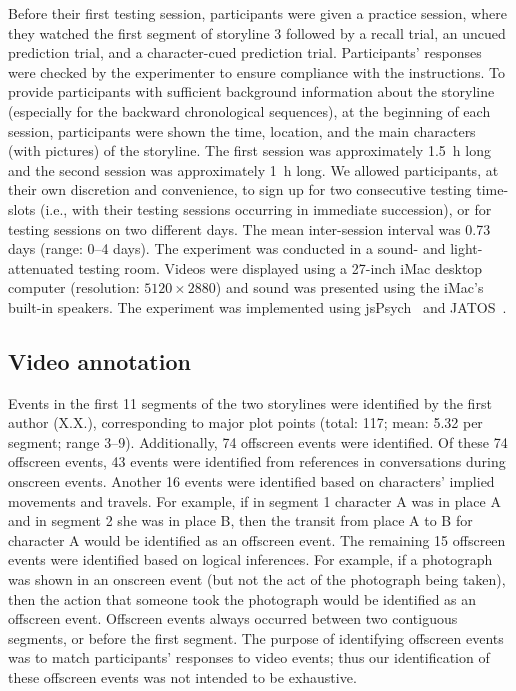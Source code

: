 \documentclass[10pt]{article}
\begin{document}
Before their first testing session, participants were given a practice session,
where they watched the first segment of storyline 3 followed by a recall trial,
an uncued prediction trial, and a character-cued prediction trial.
Participants' responses were checked by the experimenter to ensure compliance
with the instructions. To provide participants with sufficient background
information about the storyline (especially for the backward chronological
sequences), at the beginning of each session, participants were shown the time,
location, and the main characters (with pictures) of the storyline. The first
session was approximately 1.5~h long and the second session was approximately
1~h long. We allowed participants, at their own discretion and convenience, to
sign up for two consecutive testing time-slots (i.e., with their testing
sessions occurring in immediate succession), or for testing sessions on two
different days. The mean inter-session interval was 0.73 days (range: 0--4
days). The experiment was conducted in a sound- and light-attenuated testing
room. Videos were displayed using a 27-inch iMac desktop computer (resolution:
$5120 \times 2880$) and sound was presented using the iMac’s built-in speakers.
The experiment was implemented using jsPsych~\citep{deLe15} and
JATOS~\citep{LangEtal15}.

\subsection*{Video annotation}

Events in the first 11 segments of the two storylines were identified by the
first author (X.X.), corresponding to major plot points (total: 117; mean: 5.32
per segment; range 3--9). Additionally, 74 offscreen events were identified. Of
these 74 offscreen events, 43 events were identified from references in
conversations during onscreen events. Another 16 events were identified based
on characters’ implied movements and travels. For example, if in segment 1
character A was in place A and in segment 2 she was in place B, then the
transit from place A to B for character A would be identified as an offscreen
event. The remaining 15 offscreen events were identified based on logical
inferences. For example, if a photograph was shown in an onscreen event (but
not the act of the photograph being taken), then the action that someone took
the photograph would be identified as an offscreen event. Offscreen events
always occurred between two contiguous segments, or before the first segment.
The purpose of identifying offscreen events was to match participants’
responses to video events; thus our identification of these offscreen events
was not intended to be exhaustive.
\end{document}
